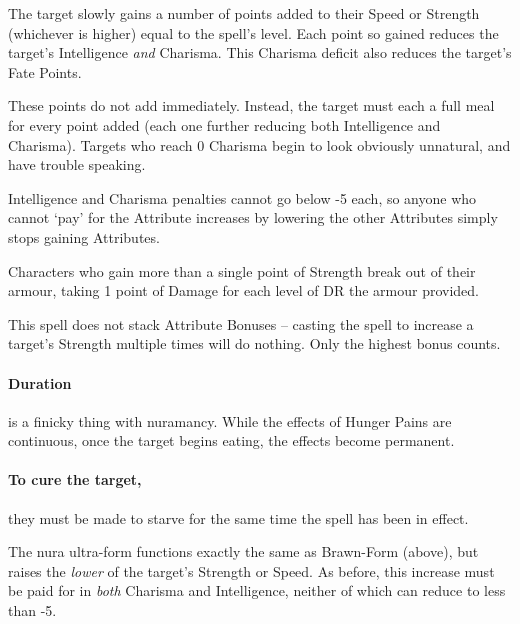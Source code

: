 \begin{multicols}{2}
The target slowly gains a number of points added to their Speed or Strength (whichever is higher) equal to the spell's level.
Each point so gained reduces the target's Intelligence \emph{and} Charisma.
This Charisma deficit also reduces the target's Fate Points.

These points do not add immediately.
Instead, the target must each a full meal for every point added (each one further reducing both Intelligence and Charisma).
Targets who reach 0 Charisma begin to look obviously unnatural, and have trouble speaking.

Intelligence and Charisma penalties cannot go below -5 each, so anyone who cannot `pay' for the Attribute increases by lowering the other Attributes simply stops gaining Attributes.

Characters who gain more than a single point of Strength break out of their armour, taking 1 point of Damage for each level of DR the armour provided.

This spell does not stack Attribute Bonuses -- casting the spell to increase a target's Strength multiple times will do nothing.
Only the highest bonus counts.

\paragraph{Duration}
is a finicky thing with nuramancy.
While the effects of Hunger Pains are continuous, once the target begins eating, the effects become permanent.

\paragraph{To cure the target,}
they must be made to starve for the same time the spell has been in effect.
\label{nura_recovery}

\spelllevel


The nura ultra-form functions exactly the same as Brawn-Form (above), but raises the \emph{lower} of the target's Strength or Speed.
As before, this increase must be paid for in \emph{both} Charisma and Intelligence, neither of which can reduce to less than -5.

\spelllevel



\end{multicols}
